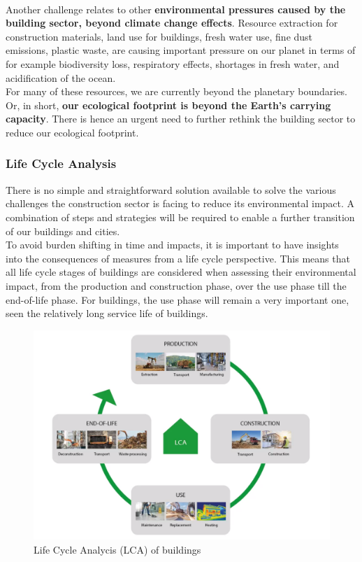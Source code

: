 \documentclass[../summary.tex]{subfiles}
\begin{document}
	\ \\
	Another challenge relates to other \textbf{environmental pressures caused by the building sector, beyond climate change effects}. Resource extraction for construction materials, land use for buildings, fresh water use, fine dust emissions, plastic waste, are causing important pressure on our planet in terms of for example biodiversity loss, respiratory effects, shortages in fresh water, and acidification of the ocean. 
	\\
	For many of these resources, we are currently beyond the planetary boundaries. Or, in short, \textbf{our ecological footprint is beyond the Earth’s carrying capacity}. There is hence an urgent need to further rethink the building sector to reduce our ecological footprint. 
	
	\subsubsection{Life Cycle Analysis}
	
	There is no simple and straightforward solution available to solve the various challenges the construction sector is facing to reduce its environmental impact. A combination of steps and strategies will be required to enable a further transition of our buildings and cities.
	\\
	To avoid burden shifting in time and impacts, it is important to have insights into the consequences of measures from a life cycle perspective. This means that all life cycle stages of buildings are considered when assessing their environmental impact, from the production and construction phase, over the use phase till the end-of-life phase. For buildings, the use phase will remain a very important one, seen the relatively long service life of buildings.
	
	\begin{figure}[H]
		\centering
		\includegraphics[width=0.7\linewidth]{../images/8-LCA}
		\caption{Life Cycle Analycis (LCA) of buildings}
		\label{fig:8-lca}
	\end{figure}
	
\end{document}
